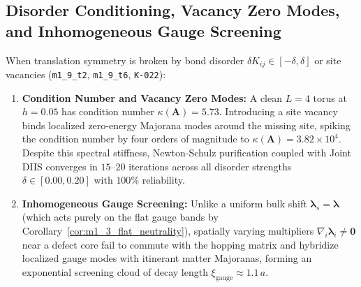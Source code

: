 \subsection{Disorder Conditioning, Vacancy Zero Modes, and Inhomogeneous Gauge Screening}
When translation symmetry is broken by bond disorder $\delta K_{ij} \in [-\delta, \delta]$ or site vacancies (\texttt{m1\_9\_t2}, \texttt{m1\_9\_t6}, \texttt{K-022}):
\begin{enumerate}
\item \textbf{Condition Number and Vacancy Zero Modes:} A clean $L=4$ torus at $h=0.05$ has condition number $\kappa(\mathbf{A}) = 5.73$. Introducing a site vacancy binds localized zero-energy Majorana modes around the missing site, spiking the condition number by four orders of magnitude to $\kappa(\mathbf{A}) = 3.82 \times 10^4$. Despite this spectral stiffness, Newton-Schulz purification coupled with Joint DIIS converges in $15\text{--}20$ iterations across all disorder strengths $\delta \in [0.00, 0.20]$ with $100\%$ reliability.
\item \textbf{Inhomogeneous Gauge Screening:} Unlike a uniform bulk shift $\boldsymbol{\lambda}_s = \boldsymbol{\lambda}$ (which acts purely on the flat gauge bands by Corollary~\ref{cor:m1_3_flat_neutrality}), spatially varying multipliers $\nabla_i \boldsymbol{\lambda}_i \neq \mathbf{0}$ near a defect core fail to commute with the hopping matrix and hybridize localized gauge modes with itinerant matter Majoranas, forming an exponential screening cloud of decay length $\xi_{\mathrm{gauge}} \approx 1.1\, a$.
\end{enumerate}

